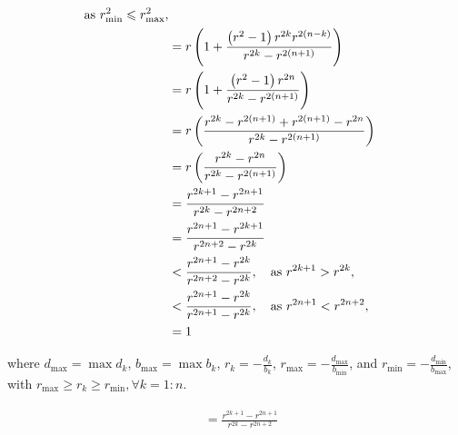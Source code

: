 \documentclass[11pt]{article}
\begin{document}
\begin{align*}
            \text{as } r_{\min }^2 \leqslant r_{\max }^2,\\
        &= r\left(1+\frac{\left(r^2-1\right) r^{2 k} r^{2(n-k)}}{r^{2 k}-r^{2(n+1)}}\right)\\
        &= r\left(1+\frac{\left(r^2-1\right) r^{2n}}{r^{2 k}-r^{2(n+1)}}\right)\\
        &=r \left(\frac{r^{2k}-r^{2(n+1)}+r^{2(n+1)}-r^{2 n}}{r^{2 k}-r^{2(n+1)}}\right)\\
        &=r \left(\frac{r^{2 k}-r^{2 n}}{r^{2 k}-r^{2(n+1)}}\right)\\
        &=\frac{r^{2 k+1}-r^{2 n+1}}{r^{2 k}-r^{2 n+2}}\\
        &=\frac{r^{2 n+1}-r^{2 k+1}}{r^{2 n+2}-r^{2 k}}\\
        &< \frac{r^{2 n+1}-r^{2 k}}
            {r^{2 n+2}-r^{2 k}} \qc
            \text{as } r^{2 k+1} > r^{2 k},\\
        &< \frac{r^{2 n+1}-r^{2 k}}
            {r^{2 n+1}-r^{2 k}} \qc
            \text{as } r^{2 n+1} < r^{2 n+2},\\
        &=1
\end{align*}



where $d_{\max } = \max{d_k}$, $b_{\max } = \max{b_k}$, $r_k = -\frac{d_k}{b_k}$, $r_{\max } = -\frac{d_{\max }}{b_{\min }}$, and $r_{\min } = -\frac{d_{\min }}{b_{\max }}$, with $r_{\max } \geqslant r_k \geqslant r_{\min }, \forall k=1:n$.


\begin{align*}
    \begin{aligned}
        &=\frac{r^{2 k+1}-r^{2 n+1}}{r^{2 k}-r^{2 n+2}}
    \end{aligned}
\end{align*}
\end{document}
